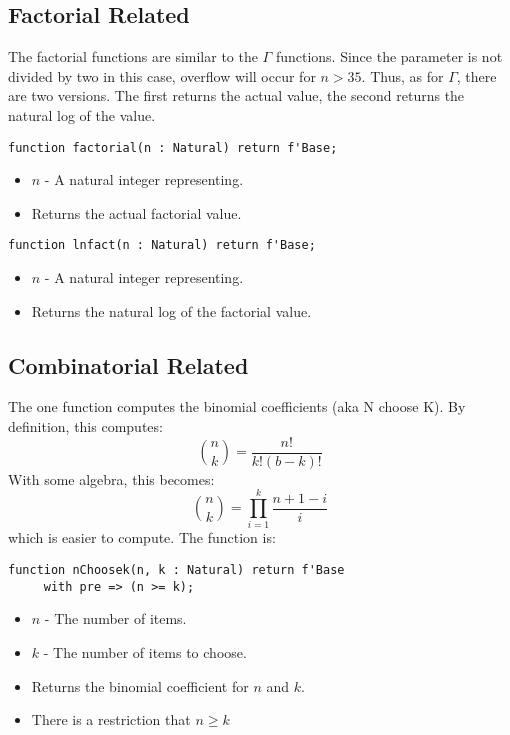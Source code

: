 \documentclass[10pt, openany]{book}
\begin{document}
\subsection{Factorial Related}
The factorial functions are similar to the $\Gamma$ functions.  Since the parameter is not divided by two in this case, overflow will occur for $n>35$.  Thus, as for $\Gamma$, there are two versions.  The first returns the actual value, the second returns the natural log of the value.
\begin{lstlisting}
function factorial(n : Natural) return f'Base;
\end{lstlisting}
\begin{itemize}
  \item $n$ - A natural integer representing.
  \item Returns the actual factorial value.
\end{itemize}
\begin{lstlisting}
function lnfact(n : Natural) return f'Base;
\end{lstlisting}
\begin{itemize}
  \item $n$ - A natural integer representing.
  \item Returns the natural log of the factorial value.
\end{itemize}

\subsection{Combinatorial Related}
The one function computes the binomial coefficients (aka N choose K).  By definition, this computes:
\begin{displaymath}
  \binom{n}{k} = \frac{n!}{k!(b-k)!}
\end{displaymath}
With some algebra, this becomes:
\begin{displaymath}
  \binom{n}{k} = \prod^k_{i=1}\frac{n+1-i}{i}
\end{displaymath}
 which is easier to compute.  The function is:
\begin{lstlisting}
function nChoosek(n, k : Natural) return f'Base
     with pre => (n >= k);
\end{lstlisting}
\begin{itemize}
  \item $n$ - The number of items.
  \item $k$ - The number of items to choose.
  \item Returns the binomial coefficient for $n$ and $k$.
  \item There is a restriction that $n\geq{}k$
\end{itemize}
\end{document}
